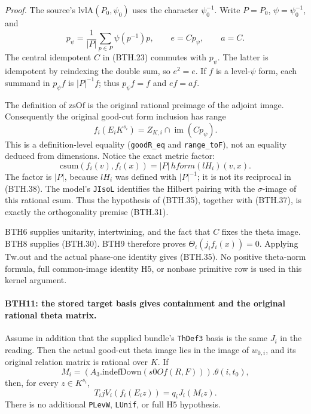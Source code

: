 \emph{Proof.}
The source's \(\mathrm{lvlA}(P_0,\psi_0)\) uses
the character \(\psi_0^{-1}\).  Write \(P=P_0\),
\(\psi=\psi_0^{-1}\), and
\[
 p_\psi=\frac1{|P|}\sum_{p\in P}\psi(p^{-1})p,
            \qquad e=Cp_\psi,\qquad a=C.                       \tag{BTH.36}
\]
The central idempotent \(C\) in (BTH.23) commutes with
\(p_\psi\).  The latter is idempotent by reindexing the
double sum, so \(e^2=e\).  If \(f\) is a level-\(\psi\)
form, each summand in \(p_\psi f\) is \(|P|^{-1}f\);
thus \(p_\psi f=f\) and \(ef=af\).

The definition of \(\mathrm{zsOf}\) is the original
rational preimage of the adjoint image.  Consequently
the original good-cut form inclusion has range
\[
       f_i(E_iK^{s_i})
            =Z_{K,i}\cap\operatorname{im}(Cp_\psi).             \tag{BTH.37}
\]
This is a definition-level equality (\texttt{good\allowbreak R\_\allowbreak eq}
and \texttt{range\_\allowbreak to\allowbreak F}), not an equality deduced from
dimensions.  Notice the exact metric factor:
\[
 \mathrm{csum}(f_i(v),f_i(x))
              =|P|\,hform(lH_i)(v,x).                         \tag{BTH.38}
\]
The factor is \(|P|\), because \(lH_i\) was defined with
\(|P|^{-1}\); it is not its reciprocal in (BTH.38).
The model's \texttt{JIso\allowbreak L} identifies the Hilbert pairing
with the \(\sigma\)-image of this rational \(\mathrm{csum}\).
Thus the hypothesis of (BTH.35), together with (BTH.37),
is exactly the orthogonality premise (BTH.31).

BTH6 supplies unitarity, intertwining, and the fact that
\(C\) fixes the theta image.  BTH8 supplies (BTH.30).
BTH9 therefore proves \(\Theta_i(j_i f_i(x))=0\).
Applying \(\mathrm{Tw.out}\) and the actual phase-one
identity gives (BTH.35).
No positive theta-norm formula, full common-image
identity \(\mathrm H5\), or nonbase primitive row is
used in this kernel argument.

\paragraph{BTH11: the stored target basis gives containment and the original rational theta matrix.}
\label{claim:BTH11}
Assume in addition that the supplied bundle's
\texttt{Th\allowbreak Def3} basis is the same \(J_i\) in the reading.
Then the actual good-cut theta image lies in the image of
\(w_{0,i}\), and its original relation matrix is rational
over \(K\).  If
\[
             M_i=(A_3.\mathrm{indefDown}(s0Of(R,F))).\theta(i,t_0),
 \tag{BTH.39}
\]
then, for every \(z\in K^{s_i}\),
\[
                T_i jV_i(f_i(E_i z))=q_iJ_i(M_i z).
 \tag{BTH.40}
\]
There is no additional \texttt{PLev\allowbreak W}, \texttt{LUnif},
or full \(\mathrm H5\) hypothesis.

